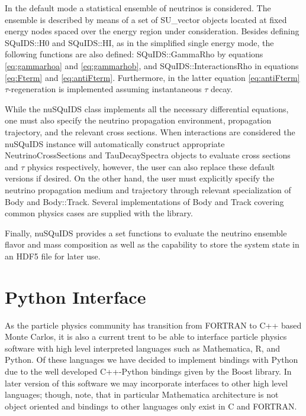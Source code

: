\documentclass[3p,12pt]{elsarticle}
\newcommand{\ttf}{\ttfamily}
\begin{document}
In the default mode a statistical ensemble of neutrinos is
considered. The ensemble is described by means of a set of {\ttf
  SU\_vector} objects located at fixed  energy nodes spaced over the
energy region under consideration. Besides defining {\ttf SQuIDS::H0}
and {\ttf SQuIDS::HI}, as in the simplified single energy mode, the
following functions are also defined: {\ttf SQuIDS::GammaRho} by
equations \eqref{eq:gammarhoa} and \eqref{eq:gammarhob}, and {\ttf
  SQuIDS::InteractionsRho} in equations \eqref{eq:Fterm} and
\eqref{eq:antiFterm}. Furthermore, in the latter equation
\eqref{eq:antiFterm} $\tau$-regeneration is implemented assuming
instantaneous $\tau$ decay.

While the {\ttf nuSQuIDS} class implements all the necessary
differential equations, one must also specify the neutrino propagation
environment, propagation trajectory, and the relevant cross sections.  
When interactions are considered the {\ttf nuSQuIDS} instance
will automatically construct appropriate {\ttf NeutrinoCrossSections}
and {\ttf TauDecaySpectra} objects to evaluate cross sections and
$\tau$ physics respectively, however, the user can also replace these
default versions if desired. On the other hand, the user must
explicitly specify the neutrino propagation medium and trajectory
through relevant specialization of {\ttf Body} and {\ttf Body::Track}.
Several implementations of {\ttf Body} and {\ttf Track} covering
common physics cases are supplied with the library. 

Finally, {\ttf nuSQuIDS} provides a set functions to evaluate the
neutrino ensemble flavor and mass composition as well as the
capability to store the system state in an HDF5 \citep{folk1999hdf5}
file for later use.








\section{Python Interface}

As the particle physics community has transition from {\ttfamily FORTRAN} to {\ttfamily C++} based Monte Carlos, it is also a current trent to be able to interface particle physics software with high level interpreted languages such as {\ttfamily Mathematica}, {\ttfamily R}, and {\ttfamily Python}. Of these languages we have decided to implement bindings with Python due to the well developed {\ttfamily C++}-{\ttfamily Python} bindings given by the {\ttfamily Boost} library. In later version of this software we may incorporate interfaces to other high level languages; though, note, that in particular {\ttfamily Mathematica} architecture is not object oriented and bindings to other languages only exist in {\ttfamily C} and {\ttfamily FORTRAN}.
\end{document}
